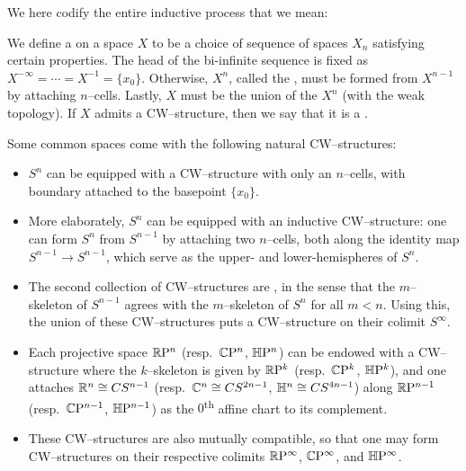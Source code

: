 We here codify the entire inductive process that we mean:

\begin{definition}
We define a  on a space $X$ to be a choice of sequence of spaces $X_n$ satisfying certain properties.
The head of the bi-infinite sequence is fixed as $X^{-\infty} = \cdots = X^{-1} = \{x_0\}$.
Otherwise, $X^n$, called the , must be formed from $X^{n-1}$ by attaching $n$--cells.
Lastly, $X$ must be the union of the $X^n$ (with the weak topology).
If $X$ admits a CW--structure, then we say that it is a .
\end{definition}

\begin{example}
Some common spaces come with the following natural CW--structures:
\begin{itemize}
    \item $S^n$ can be equipped with a CW--structure with only an $n$--cells, with boundary attached to the basepoint $\{x_0\}$.
    \item More elaborately, $S^n$ can be equipped with an inductive CW--structure: one can form $S^n$ from $S^{n-1}$ by attaching two $n$--cells, both along the identity map $S^{n-1} \to S^{n-1}$, which serve as the upper- and lower-hemispheres of $S^n$.
    \item The second collection of CW--structures are , in the sense that the $m$--skeleton of $S^{n-1}$ agrees with the $m$--skeleton of $S^n$ for all $m < n$.  Using this, the union of these CW--structures puts a CW--structure on their colimit $S^\infty$.
    \item Each projective space $\mathbb R \mathrm{P}^n$ (resp.\ $\mathbb C \mathrm{P}^n$, $\mathbb H \mathrm{P}^n$) can be endowed with a CW--structure where the $k$--skeleton is given by $\mathbb R \mathrm{P}^k$ (resp.\ $\mathbb C \mathrm{P}^k$, $\mathbb H \mathrm{P}^k$), and one attaches $\mathbb R^n \cong CS^{n-1}$ (resp.\ $\mathbb C^n \cong CS^{2n-1}$, $\mathbb H^n \cong CS^{4n-1}$) along $\mathbb R \mathrm{P}^{n-1}$ (resp.\ $\mathbb C \mathrm{P}^{n-1}$, $\mathbb H \mathrm{P}^{n-1}$) as the $0$\textsuperscript{th} affine chart to its complement.
    \item These CW--structures are also mutually compatible, so that one may form CW--structures on their respective colimits $\mathbb R \mathrm{P}^\infty$, $\mathbb C \mathrm{P}^\infty$, and $\mathbb H \mathrm{P}^\infty$.
\end{itemize}
\end{example}


